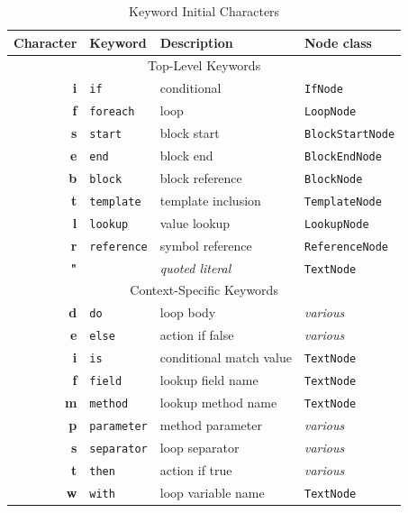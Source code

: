 \begin{table}[ht!]
\fontsize{9}{11}\selectfont
  \begin{center}
    \begin{tabular}{rlll}
      \textbf{Character} & \textbf{Keyword} & \textbf{Description} & \textbf{Node class} \\
      \toprule
      \multicolumn{4}{c}{Top-Level Keywords} \\
      \textbf{i} & \verb!if! & conditional & \verb!IfNode! \\
      \textbf{f} & \verb!foreach! & loop & \verb!LoopNode! \\
      \textbf{s} & \verb!start! & block start & \verb!BlockStartNode! \\
      \textbf{e} & \verb!end! & block end & \verb!BlockEndNode! \\
      \textbf{b} & \verb!block! & block reference & \verb!BlockNode! \\
      \textbf{t} & \verb!template! & template inclusion & \verb!TemplateNode! \\
      \textbf{l} & \verb!lookup! & value lookup & \verb!LookupNode! \\
      \textbf{r} & \verb!reference! & symbol reference & \verb!ReferenceNode! \\
      \textbf{"} & & \emph{quoted literal} & \verb!TextNode! \\
      \hline
      \multicolumn{4}{c}{Context-Specific Keywords} \\
      \textbf{d} & \verb!do! & loop body & \emph{various} \\
      \textbf{e} & \verb!else! & action if false & \emph{various} \\
      \textbf{i} & \verb!is! & conditional match value & \verb!TextNode! \\
      \textbf{f} & \verb!field! & lookup field name & \verb!TextNode! \\
      \textbf{m} & \verb!method! & lookup method name & \verb!TextNode! \\
      \textbf{p} & \verb!parameter! & method parameter & \emph{various} \\
      \textbf{s} & \verb!separator! & loop separator & \emph{various} \\
      \textbf{t} & \verb!then! & action if true & \emph{various} \\
      \textbf{w} & \verb!with! & loop variable name & \verb!TextNode! \\
    \end{tabular}
  \end{center}
\caption{Keyword Initial Characters}
\label{gilt:table:initial characters}
\end{table}

